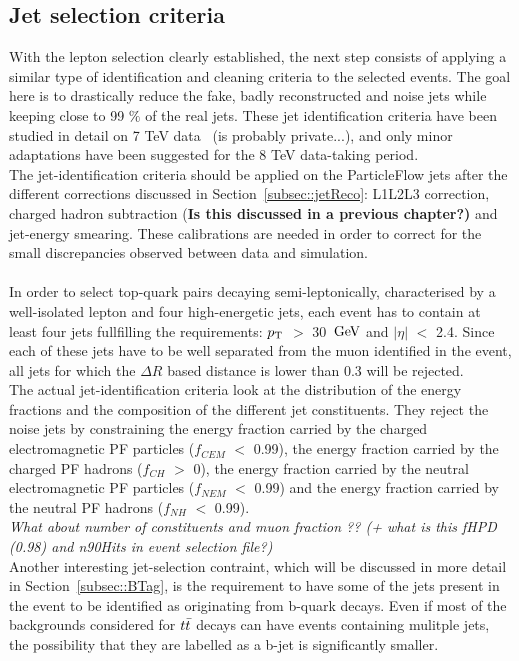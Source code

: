 \subsection{Jet selection criteria}   %
With the lepton selection clearly established, the next step consists of applying a similar type of identification and cleaning criteria to the selected events.
The goal here is to drastically reduce the fake, badly reconstructed and noise jets while keeping close to 99 $\%$ of the real jets. These jet identification criteria have been studied in detail on 7 TeV data~\cite{JetId7TeV} (is probably private...), and only minor adaptations have been suggested for the 8 TeV data-taking period.
\\
The jet-identification criteria should be applied on the ParticleFlow jets after the different corrections discussed in Section~\ref{subsec::jetReco}: L1L2L3 correction, charged hadron subtraction (\textbf{Is this discussed in a previous chapter?)} %
and jet-energy smearing. These calibrations are needed in order to correct for the small discrepancies observed between data and simulation.
\\
\\
In order to select top-quark pairs decaying semi-leptonically, characterised by a well-isolated lepton and four high-energetic jets, each event has to contain at least four jets fullfilling the requirements: $p_{\rm T}$ $>$ 30 $\, \mathrm{GeV}$ and $\vert \eta \vert$ $<$ 2.4.
Since each of these jets have to be well separated from the muon identified in the event, all jets for which the $\Delta R$ based distance is lower than 0.3 will be rejected.
\\
The actual jet-identification criteria look at the distribution of the energy fractions and the composition of the different jet constituents.
They reject the noise jets by constraining the energy fraction carried by the charged electromagnetic PF particles ($f_{CEM}$ $<$ 0.99), the energy fraction carried by the charged PF hadrons ($f_{CH}$ $>$ 0), the energy fraction carried by the neutral electromagnetic PF particles ($f_{NEM}$ $<$ 0.99) and the energy fraction carried by the neutral PF hadrons ($f_{NH}$ $<$ 0.99).
\\
\textit{What about number of constituents and muon fraction ?? (+ what is this fHPD (0.98) and n90Hits in event selection file?)}
\\

Another interesting jet-selection contraint, which will be discussed in more detail in Section~\ref{subsec::BTag}, is the requirement to have some of the jets present in the event to be identified as originating from b-quark decays. Even if most of the backgrounds considered for $t\bar{t}$ decays can have events containing mulitple jets, the possibility that they are labelled as a b-jet is significantly smaller.

